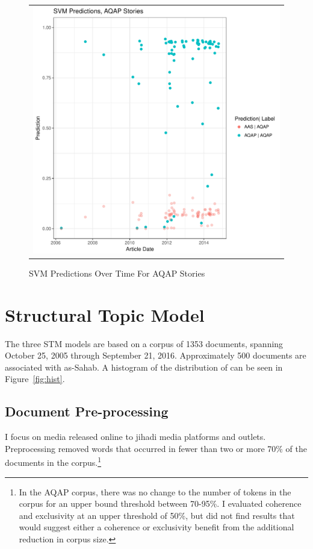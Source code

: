 \begin{figure}
\begin{center}
\begin{tabular}{c}
  \includegraphics[width=5.00in]{./Pictures/PredictedProbabilities_AQAPPreds.pdf}\\
\end{tabular}
\caption{SVM Predictions Over Time For AQAP Stories}
\label{fig:svm-mis}
\end{center}
\end{figure}

\section{Structural Topic Model}

The three STM models are based on a corpus of 1353 documents, spanning October
25, 2005 through September 21, 2016. Approximately 500 documents are
associated with as-Sahab. A histogram of the distribution
of can be seen in Figure~\ref{fig:hist}. 

\subsection{Document Pre-processing}

I focus on media released online to jihadi media platforms and
outlets.  Preprocessing removed words that occurred in fewer than two or more 70\%
of the documents in the corpus.\footnote{In the AQAP corpus, there was
no change to the number of tokens in the corpus for an upper bound
threshold between 70-95\%. I evaluated coherence and exclusivity at
an upper threshold of 50\%, but did not find results that would
suggest either a coherence or exclusivity benefit from the additional
reduction in corpus size.}

